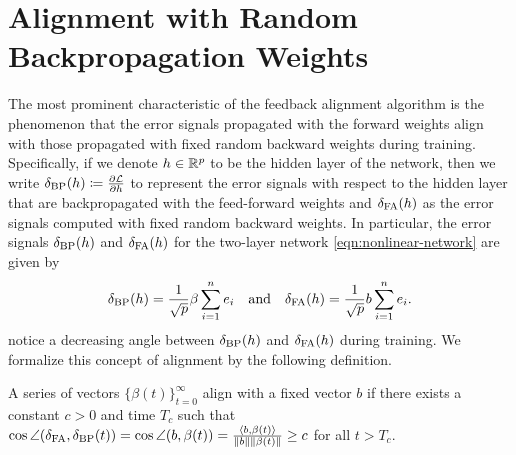 
\section{Alignment with Random Backpropagation Weights}\label{sec:alignment}

The most prominent characteristic of the feedback alignment algorithm is the phenomenon that the error signals propagated with the forward weights align with those propagated with fixed random backward weights during training. Specifically, if we denote $h\in \mathbb{R}^p$ to be the hidden layer of the network, then we write $\delta_\mathrm{BP}(h) \coloneqq \frac{\partial \mathcal{L}}{\partial h}$ to represent the error signals with respect to the hidden layer that are backpropagated with the feed-forward weights and $\delta_\mathrm{FA}(h)$ as the error signals computed with fixed random backward weights.
In particular, the error signals $\delta_\mathrm{BP}(h)$ and $\delta_\mathrm{FA}(h)$ for the two-layer network \eqref{eqn:nonlinear-network} are given by
\begin{equation*}
    \delta_\mathrm{BP}(h) = \frac{1}{\sqrt{p}}\beta\sum_{i=1}^ne_i \quad\text{and}\quad \delta_\mathrm{FA}(h) = \frac{1}{\sqrt{p}}b\sum_{i=1}^ne_i.
\end{equation*}
\citet{lillicrap2016random} notice a decreasing angle between $\delta_\mathrm{BP}(h)$ and $\delta_\mathrm{FA}(h)$ during training. We formalize this concept of alignment by the following definition.
\begin{definition}\label{def:alignment}
    A series of vectors $\{\beta(t)\}_{t=0}^\infty$ align with a fixed vector $b$ if there exists a constant $c>0$ and time $T_c$ such that  $\cos\angle(\delta_\mathrm{FA}, \delta_\mathrm{BP}(t)) = \cos\angle(b, \beta(t)) = \frac{\langle b, \beta(t)\rangle}{\|b\|\|\beta(t)\|} \geq c$ for all $t > T_c$.
\end{definition}


